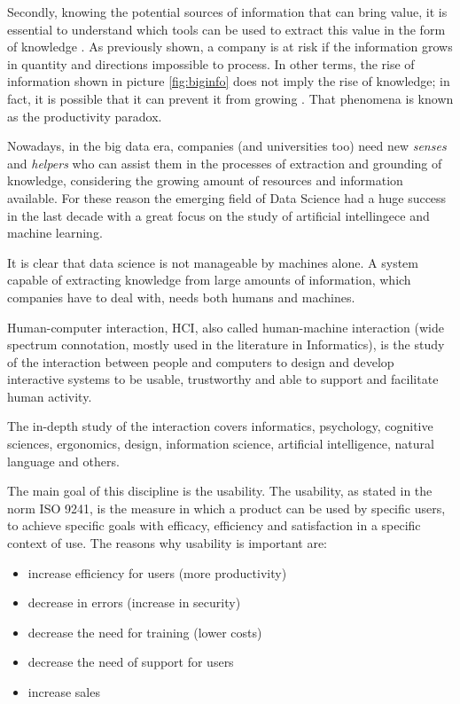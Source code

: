 \documentclass[]{book}
\theoremstyle{definition}
\theoremstyle{definition}
\theoremstyle{definition}
\theoremstyle{remark}
\begin{document}
Secondly, knowing the potential sources of information that can bring
value, it is essential to understand which tools can be used to extract
this value in the form of knowledge
\citep{hand2007principles, mining2006data}. As previously shown, a
company is at risk if the information grows in quantity and directions
impossible to process. In other terms, the rise of information shown in
picture \ref{fig:biginfo} does not imply the rise of knowledge; in fact,
it is possible that it can prevent it from growing
\citep{allen2003information, herbig1994effect}. That phenomena is known
as the productivity paradox.

Nowadays, in the big data era, companies (and universities too) need new
\emph{senses} and \emph{helpers} who can assist them in the processes of
extraction and grounding of knowledge, considering the growing amount of
resources and information available. For these reason the emerging field
of Data Science had a huge success in the last decade with a great focus
on the study of artificial intellingece and machine learning.

It is clear that data science is not manageable by machines alone. A
system capable of extracting knowledge from large amounts of
information, which companies have to deal with, needs both humans and
machines.

Human-computer interaction, HCI, also called human-machine interaction
(wide spectrum connotation, mostly used in the literature in
Informatics), is the study of the interaction between people and
computers to design and develop interactive systems to be usable,
trustworthy and able to support and facilitate human activity.

The in-depth study of the interaction covers informatics, psychology,
cognitive sciences, ergonomics, design, information science, artificial
intelligence, natural language and others.

The main goal of this discipline is the usability. The usability, as
stated in the norm ISO 9241, is the measure in which a product can be
used by specific users, to achieve specific goals with efficacy,
efficiency and satisfaction in a specific context of use. The reasons
why usability is important are:

\begin{itemize}
\item
  increase efficiency for users (more productivity)
\item
  decrease in errors (increase in security)
\item
  decrease the need for training (lower costs)
\item
  decrease the need of support for users
\item
  increase sales
\end{itemize}
\end{document}
